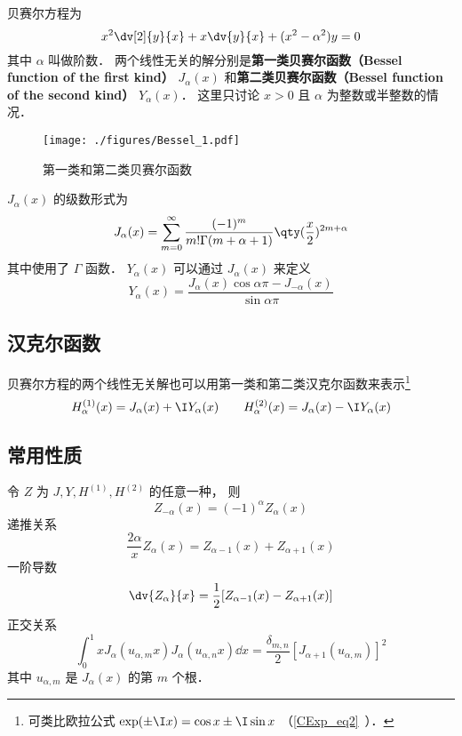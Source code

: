 
贝赛尔方程为%
\begin{equation}\label{Bessel_eq1}
x^2 \dv[2]{y}{x} + x\dv{y}{x} + (x^2 - \alpha ^2)y = 0
\end{equation}
其中 $\alpha$ 叫做阶数． 两个线性无关的解分别是\textbf{第一类贝赛尔函数（Bessel function of the first kind）} $J_\alpha(x)$ 和\textbf{第二类贝赛尔函数（Bessel function of the second kind）} $Y_\alpha(x)$． 这里只讨论 $x > 0$ 且 $\alpha$ 为整数或半整数的情况．

\begin{figure}[ht]
\centering
\texttt{[image: ./figures/Bessel\_1.pdf]}
\caption{第一类和第二类贝赛尔函数} \label{Bessel_fig1}
\end{figure}

$J_\alpha(x)$ 的级数形式为
\begin{equation}
J_\alpha(x) = \sum_{m=0}^\infty \frac{(-1)^m}{m!\Gamma(m+\alpha+1)} \qty(\frac x2)^{2m+\alpha}
\end{equation}
其中使用了 $\Gamma$ 函数． $Y_\alpha(x)$ 可以通过 $J_\alpha(x)$ 来定义
\begin{equation}
Y_\alpha(x) = \frac{J_\alpha(x)\cos\alpha\pi - J_{-\alpha}(x)}{\sin\alpha\pi}
\end{equation}

\subsection{汉克尔函数}
贝赛尔方程的两个线性无关解也可以用第一类和第二类汉克尔函数来表示\footnote{可类比欧拉公式 $\exp(\pm\I x) = \cos x \pm \I\sin x$ （\autoref{CExp_eq2}~）．}
\begin{equation}
H_\alpha ^{(1)}(x) = J_\alpha(x) + \I Y_\alpha(x)
\qquad
H_\alpha ^{(2)}(x) = J_\alpha(x) - \I Y_\alpha(x)
\end{equation}

\subsection{常用性质}
令 $Z$ 为 $J, Y, H^{(1)}, H^{(2)}$ 的任意一种， 则
\begin{equation}
Z_{-\alpha}(x) = (-1)^\alpha Z_\alpha(x)
\end{equation}
递推关系
\begin{equation}
\frac{2\alpha}{x} Z_\alpha(x) = Z_{\alpha -1}(x) + Z_{\alpha+1}(x)
\end{equation}
一阶导数
\begin{equation}
\dv{Z_\alpha}{x} = \frac12 [Z_{\alpha  - 1}(x) - Z_{\alpha +1}(x)]
\end{equation}
正交关系
\begin{equation}
\int_0^1 x J_\alpha (u_{\alpha ,m} x) J_\alpha (u_{\alpha ,n} x) \dd{x} = \frac{\delta_{m,n}}{2}[J_{\alpha + 1} (u_{\alpha ,m})]^2
\end{equation}
其中 $u_{\alpha, m}$ 是 $J_\alpha(x)$ 的第 $m$ 个根．

